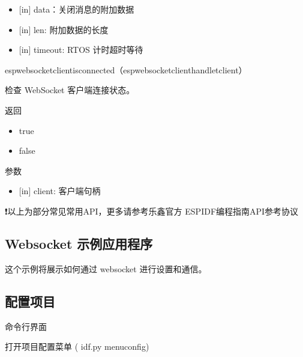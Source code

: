 \documentclass[a4paper,12pt,english]{sphinxmanual}
\begin{document}
{{\begin{itemize}
\item {} 
\sphinxAtStartPar
{[}in{]} data：关闭消息的附加数据

\item {} 
\sphinxAtStartPar
{[}in{]} len: 附加数据的长度

\item {} 
\sphinxAtStartPar
{[}in{]} timeout: RTOS 计时超时等待

\end{itemize}

\begin{sphinxVerbatim}[commandchars=\\\{\}]
esp\PYGZus{}websocket\PYGZus{}client\PYGZus{}is\PYGZus{}connected（esp\PYGZus{}websocket\PYGZus{}client\PYGZus{}handle\PYGZus{}tclient）
\end{sphinxVerbatim}

\sphinxAtStartPar
检查 WebSocket 客户端连接状态。

\sphinxAtStartPar
返回
\begin{itemize}
\item {} 
\sphinxAtStartPar
true

\item {} 
\sphinxAtStartPar
false

\end{itemize}

\sphinxAtStartPar
参数
\begin{itemize}
\item {} 
\sphinxAtStartPar
{[}in{]} client: 客户端句柄

\end{itemize}

\sphinxAtStartPar
❗以上为部分常见常用API，更多请参考乐鑫官方 ESP\sphinxhyphen{}IDF编程指南\sphinxhyphen{}API参考\sphinxhyphen{}协议


\subsection{Websocket 示例应用程序}
\label{\detokenize{exp-esp32/websocket:websocket}}
\sphinxAtStartPar
这个示例将展示如何通过 websocket 进行设置和通信。


\subsection{配置项目}
\label{\detokenize{exp-esp32/websocket:id6}}
\sphinxAtStartPar
命令行界面

\sphinxAtStartPar
打开项目配置菜单 ( idf.py menuconfig)

}}
\end{document}
